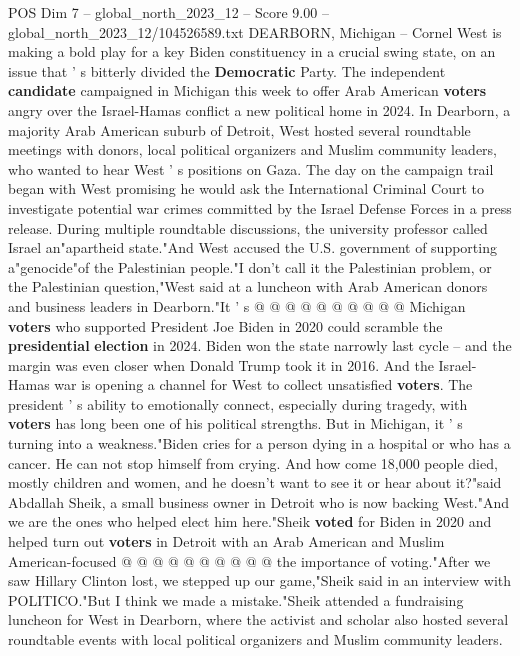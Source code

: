 \begin{textsample}{POS Dim 7 – global\_north\_2023\_12 – Score 9.00 – global\_north\_2023\_12/104526589.txt}  \label{ex:f7_pos_151}
DEARBORN, Michigan -- Cornel West is making a bold play for a key Biden constituency in a crucial swing state, on an issue that ' s bitterly divided the \textbf{Democratic} Party.
The independent \textbf{candidate} campaigned in Michigan this week to offer Arab American \textbf{voters} angry over the Israel-Hamas conflict a new political home in 2024.
In Dearborn, a majority Arab American suburb of Detroit, West hosted several roundtable meetings with donors, local political organizers and Muslim community leaders, who wanted to hear West ' s positions on Gaza.
The day on the campaign trail began with West promising he would ask the International Criminal Court to investigate potential war crimes committed by the Israel Defense Forces in a press release.
During multiple roundtable discussions, the university professor called Israel an"apartheid state."And West accused the U.S. government of supporting a"genocide"of the Palestinian people."I don't call it the Palestinian problem, or the Palestinian question,"West said at a luncheon with Arab American donors and business leaders in Dearborn."It ' s @ @ @ @ @ @ @ @ @ @ Michigan \textbf{voters} who supported President Joe Biden in 2020 could scramble the \textbf{presidential} \textbf{election} in 2024.
Biden won the state narrowly last cycle -- and the margin was even closer when Donald Trump took it in 2016.
And the Israel-Hamas war is opening a channel for West to collect unsatisfied \textbf{voters}.
The president ' s ability to emotionally connect, especially during tragedy, with \textbf{voters} has long been one of his political strengths.
But in Michigan, it ' s turning into a weakness."Biden cries for a person dying in a hospital or who has a cancer.
He can not stop himself from crying.
And how come 18,000 people died, mostly children and women, and he doesn't want to see it or hear about it?"said Abdallah Sheik, a small business owner in Detroit who is now backing West."And we are the ones who helped elect him here."Sheik \textbf{voted} for Biden in 2020 and helped turn out \textbf{voters} in Detroit with an Arab American and Muslim American-focused @ @ @ @ @ @ @ @ @ @ the importance of voting."After we saw Hillary Clinton lost, we stepped up our game,"Sheik said in an interview with POLITICO."But I think we made a mistake."Sheik attended a fundraising luncheon for West in Dearborn, where the activist and scholar also hosted several roundtable events with local political organizers and Muslim community leaders.

\end{textsample}
